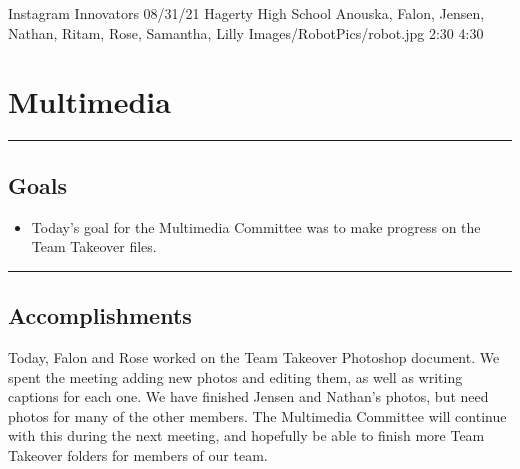 \insertmeeting 
	{Instagram Innovators} 
	{08/31/21}
	{Hagerty High School}
	{Anouska, Falon, Jensen, Nathan, Ritam, Rose, Samantha, Lilly}
	{Images/RobotPics/robot.jpg}
	{2:30}
  {4:30}
	
\section*{Multimedia}
\noindent\hfil\rule{\textwidth}{.4pt}\hfil
\subsection*{Goals}
\begin{itemize}
    \item Today's goal for the Multimedia Committee was to make progress on the Team Takeover files.
  

\end{itemize} 

\noindent\hfil\rule{\textwidth}{.4pt}\hfil

\subsection*{Accomplishments}
Today, Falon and Rose worked on the Team Takeover Photoshop document. We spent the meeting adding new photos and editing them, as well as writing captions for each one. We have finished Jensen and Nathan's photos, but need photos for many of the other members. The Multimedia Committee will continue with this during the next meeting, and hopefully be able to finish more Team Takeover folders for members of our team.